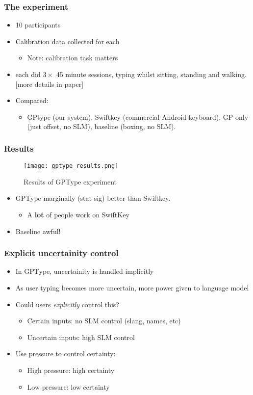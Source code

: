 \begin{frame}
	\frametitle{The experiment}
	\begin{itemize}
		\item 10 participants
		\item Calibration data collected for each
		\begin{itemize}
			\item Note: calibration task matters
		\end{itemize}
		\item each did $3\times$ 45 minute sessions, typing whilst sitting, standing and walking. [more details in paper]
		\item Compared:
		\begin{itemize}
			\item GPtype (our system), Swiftkey (commercial Android keyboard), GP only (just offset, no \ac{SLM}), baseline (boxing, no \ac{SLM}).
		\end{itemize}
	\end{itemize}
\end{frame}

\begin{frame}
	\frametitle{Results}
	\begin{figure}[tbh]
		\centering\texttt{[image: gptype\_results.png]}
		\centering\caption{\label{fig:gptype_results}Results of GPType experiment}
	\end{figure}
	\begin{itemize}
		\item GPType marginally (stat sig) better than Swiftkey.
		\begin{itemize}
			\item A {\bf lot} of people work on SwiftKey
		\end{itemize}
		\item Baseline awful!
	\end{itemize}
\end{frame}

\begin{frame}
	\frametitle{Explicit uncertainity control}
	\begin{itemize}
		\item In GPType, uncertainity is handled implicitly
		\item As user typing becomes more uncertain, more power given to language model
		\item Could users \emph{explicitly} control this?
		\begin{itemize}
			\item Certain inputs: no \ac{SLM} control (slang, names, etc)
			\item Uncertain inputs: high \ac{SLM} control
		\end{itemize}
		\item Use pressure to control certainty:
		\begin{itemize}
			\item High pressure: high certainty
			\item Low pressure: low certainty
		\end{itemize}
	\end{itemize}
\end{frame}

